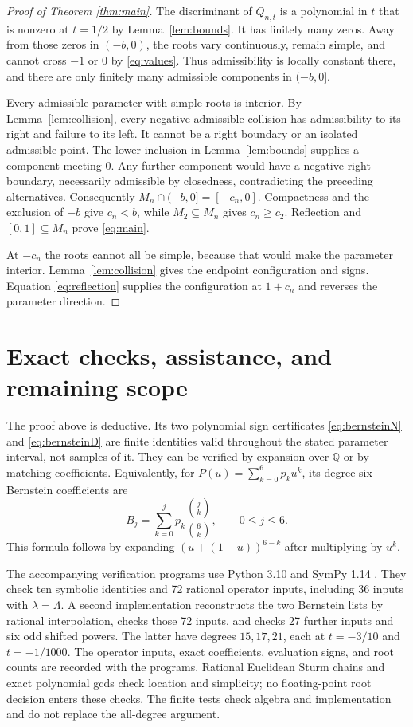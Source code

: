 \documentclass[11pt]{article}
\theoremstyle{remark}
\newcommand{\Q}{\mathbb{Q}}
\begin{document}
\begin{proof}[Proof of Theorem \ref{thm:main}]
The discriminant of $Q_{n,t}$ is a polynomial in $t$ that is nonzero at
$t=1/2$ by Lemma~\ref{lem:bounds}. It has finitely many zeros.
Away from those zeros in $(-b,0)$, the roots vary continuously, remain
simple, and cannot cross $-1$ or $0$ by \eqref{eq:values}. Thus
admissibility is locally constant there, and there are only finitely
many admissible components in $(-b,0]$.

Every admissible parameter with simple roots is interior. By
Lemma~\ref{lem:collision}, every negative admissible collision has
admissibility to its right and failure to its left. It cannot be a
right boundary or an isolated admissible point. The lower inclusion
in Lemma~\ref{lem:bounds} supplies a component meeting $0$. Any further
component would have a negative right boundary, necessarily admissible
by closedness, contradicting the preceding alternatives.
Consequently $M_n\cap(-b,0]=[-c_n,0]$. Compactness and the exclusion of
$-b$ give $c_n<b$, while $M_2\subseteq M_n$ gives $c_n\ge c_2$.
Reflection and $[0,1]\subseteq M_n$ prove \eqref{eq:main}.

At $-c_n$ the roots cannot all be simple, because that would make the
parameter interior. Lemma~\ref{lem:collision} gives the endpoint
configuration and signs. Equation \eqref{eq:reflection} supplies the
configuration at $1+c_n$ and reverses the parameter direction.
\end{proof}

\section{Exact checks, assistance, and remaining scope}

The proof above is deductive. Its two polynomial sign certificates
\eqref{eq:bernsteinN} and \eqref{eq:bernsteinD} are finite identities
valid throughout the stated parameter interval, not samples of it.
They can be verified by expansion over $\Q$ or by matching coefficients.
Equivalently, for $P(u)=\sum_{k=0}^6p_ku^k$, its degree-six Bernstein
coefficients are
\[
 B_j=\sum_{k=0}^j p_k\frac{\binom jk}{\binom6k},\qquad 0\le j\le6.
\]
This formula follows by expanding $(u+(1-u))^{6-k}$ after multiplying by
$u^k$.

The accompanying verification programs use Python 3.10 and SymPy 1.14
\cite{Meurer2017}. They check ten symbolic identities and 72 rational
operator inputs, including 36 inputs with $\lambda=\Lambda$. A second
implementation reconstructs the two Bernstein lists by rational
interpolation, checks those 72 inputs, and checks 27 further inputs and
six odd shifted powers. The latter have degrees $15,17,21$, each at
$t=-3/10$ and $t=-1/1000$. The operator inputs, exact coefficients,
evaluation signs, and root counts are recorded with the programs.
Rational Euclidean Sturm chains and exact polynomial gcds check location
and simplicity; no floating-point root decision enters these checks.
The finite tests check algebra and implementation and do not replace
the all-degree argument.
\end{document}
